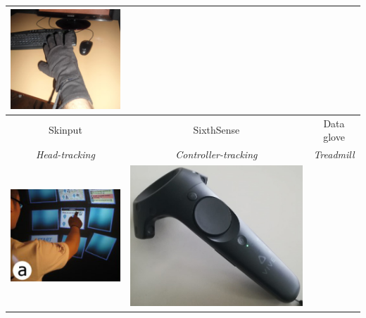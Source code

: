 \begin{table}[h!]
\begin{center}
\begin{tabular}{ | c | c | c | }
\begin{minipage}{.3\textwidth}
      \includegraphics[scale=0.45]{Bilder/Hauptteil/dataglove}
    \vspace*{0.1cm}
    \end{minipage}
    \\ 
    \hline
    Skinput & SixthSense & Data glove \\
    \hline
    \textit{Head-tracking} & \textit{Controller-tracking} & \textit{Treadmill} \\
    \hline
    \begin{minipage}{.3\textwidth}
      \includegraphics[scale=0.8]{Bilder/Hauptteil/thepersonalcockpit}
    \end{minipage}
    &
    \begin{minipage}{.3\textwidth}
      \includegraphics[scale=0.3]{Bilder/Hauptteil/vivecontroller}

\end{minipage}
\end{tabular}
\end{center}
\end{table}
